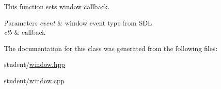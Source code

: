 This function sets window callback. 


\begin{DoxyParams}{Parameters}
{\em event} & window event type from S\+DL \\
\hline
{\em clb} & callback \\
\hline
\end{DoxyParams}


The documentation for this class was generated from the following files\+:\begin{DoxyCompactItemize}
\item 
student/\hyperlink{window_8hpp}{window.\+hpp}\item 
student/\hyperlink{window_8cpp}{window.\+cpp}\end{DoxyCompactItemize}
